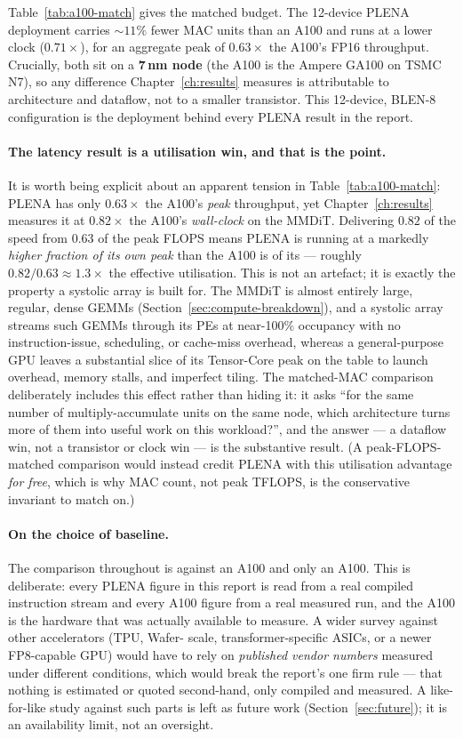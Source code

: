 \documentclass[11pt]{report}
\begin{document}
Table~\ref{tab:a100-match} gives the matched budget. The 12-device PLENA
deployment carries ${\sim}11\%$ fewer MAC units than an A100 and runs at a
lower clock ($0.71\times$), for an aggregate peak of $0.63\times$ the
A100's FP16 throughput. Crucially, both sit on a \textbf{7\,nm node} (the
A100 is the Ampere GA100 on TSMC N7), so any difference Chapter~\ref{ch:results}
measures is attributable to architecture and dataflow, not to a smaller
transistor. This 12-device, BLEN-8 configuration is the deployment behind
every PLENA result in the report.

\paragraph{The latency result is a utilisation win, and that is the point.}
It is worth being explicit about an apparent tension in
Table~\ref{tab:a100-match}: PLENA has only $0.63\times$ the A100's
\emph{peak} throughput, yet Chapter~\ref{ch:results} measures it at
$0.82\times$ the A100's \emph{wall-clock} on the MMDiT. Delivering $0.82$ of
the speed from $0.63$ of the peak FLOPS means PLENA is running at a markedly
\emph{higher fraction of its own peak} than the A100 is of its --- roughly
$0.82/0.63 \approx 1.3\times$ the effective utilisation. This is not an
artefact; it is exactly the property a systolic array is built for. The MMDiT
is almost entirely large, regular, dense GEMMs (Section~\ref{sec:compute-breakdown}),
and a systolic array streams such GEMMs through its PEs at near-100\%
occupancy with no instruction-issue, scheduling, or cache-miss overhead,
whereas a general-purpose GPU leaves a substantial slice of its Tensor-Core
peak on the table to launch overhead, memory stalls, and imperfect tiling.
The matched-MAC comparison deliberately includes this effect rather than
hiding it: it asks ``for the same number of multiply-accumulate units on the
same node, which architecture turns more of them into useful work on this
workload?'', and the answer --- a dataflow win, not a transistor or clock
win --- is the substantive result. (A peak-FLOPS-matched comparison would
instead credit PLENA with this utilisation advantage \emph{for free}, which
is why MAC count, not peak TFLOPS, is the conservative invariant to match
on.)

\paragraph{On the choice of baseline.} The comparison throughout is against
an A100 and only an A100. This is deliberate: every PLENA figure in this
report is read from a real compiled instruction stream and every A100 figure
from a real measured run, and the A100 is the hardware that was actually
available to measure. A wider survey against other accelerators (TPU, Wafer-
scale, transformer-specific ASICs, or a newer FP8-capable GPU) would have to
rely on \emph{published vendor numbers} measured under different conditions,
which would break the report's one firm rule --- that nothing is estimated or
quoted second-hand, only compiled and measured. A like-for-like study against
such parts is left as future work (Section~\ref{sec:future}); it is an
availability limit, not an oversight.
\end{document}
